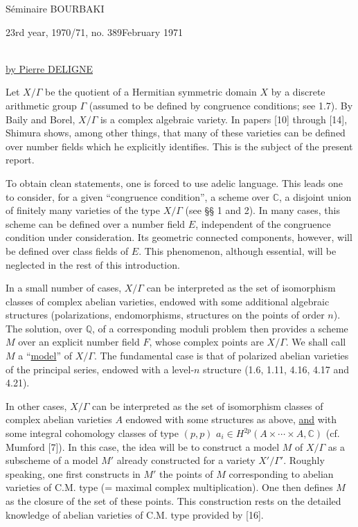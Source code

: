 \documentclass[10pt]{article}
\newcommand{\C}{\mathbb C}
\newcommand{\Q}{\mathbb Q}
\begin{document}
\noindent Séminaire BOURBAKI\par
\noindent 23rd year, 1970/71, no. 389\hfill February 1971\par\vspace{2.2em}
\begingroup
\renewcommand{\thefootnote}{(*)}
\begin{center}
{\Large\bfseries {}}\\[1.2em]
\uline{by Pierre DELIGNE}
\end{center}
\endgroup

Let $X/\Gamma$ be the quotient of a Hermitian symmetric domain $X$ by a discrete arithmetic group $\Gamma$ (assumed to be defined by congruence conditions; see 1.7). By Baily and Borel, $X/\Gamma$ is a complex algebraic variety. In papers [10] through [14], Shimura shows, among other things, that many of these varieties can be defined over number fields which he explicitly identifies. This is the subject of the present report.

To obtain clean statements, one is forced to use adelic language. This leads one to consider, for a given ``congruence condition'', a scheme over $\C$, a disjoint union of finitely many varieties of the type $X/\Gamma$ (see §§ 1 and 2). In many cases, this scheme can be defined over a number field $E$, independent of the congruence condition under consideration. Its geometric connected components, however, will be defined over class fields of $E$. This phenomenon, although essential, will be neglected in the rest of this introduction.

In a small number of cases, $X/\Gamma$ can be interpreted as the set of isomorphism classes of complex abelian varieties, endowed with some additional algebraic structures (polarizations, endomorphisms, structures on the points of order $n$). The solution, over $\Q$, of a corresponding moduli problem then provides a scheme $M$ over an explicit number field $F$, whose complex points are $X/\Gamma$. We shall call $M$ a ``\uline{model}'' of $X/\Gamma$. The fundamental case is that of polarized abelian varieties of the principal series, endowed with a level-$n$ structure (1.6, 1.11, 4.16, 4.17 and 4.21).

In other cases, $X/\Gamma$ can be interpreted as the set of isomorphism classes of complex abelian varieties $A$ endowed with some structures as above, \uline{and} with some integral cohomology classes of type $(p,p)$ $a_i\in H^{2p}(A\times\cdots\times A,\C)$ (cf. Mumford [7]). In this case, the idea will be to construct a model $M$ of $X/\Gamma$ as a subscheme of a model $M'$ already constructed for a variety $X'/\Gamma'$. Roughly speaking, one first constructs in $M'$ the points of $M$ corresponding to abelian varieties of C.M. type (= maximal complex multiplication). One then defines $M$ as the closure of the set of these points. This construction rests on the detailed knowledge of abelian varieties of C.M. type provided by [16].
\end{document}
